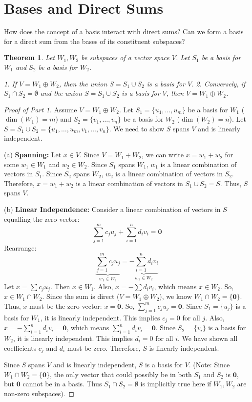 \documentclass[11pt]{article}
\theoremstyle{plain}
\newtheorem{theorem}{Theorem}[section]
\theoremstyle{definition}
\theoremstyle{remark}
\DeclareMathOperator{\dimv}{dim} %
\newcommand{\veczero}{\mathbf{0}} %
\begin{document}
\section{Bases and Direct Sums}

How does the concept of a basis interact with direct sums? Can we form a basis for a direct sum from the bases of its constituent subspaces?

\begin{theorem}
Let $W_1, W_2$ be subspaces of a vector space $V$. Let $S_1$ be a basis for $W_1$ and $S_2$ be a basis for $W_2$.

1.  If $V = W_1 \oplus W_2$, then the union $S = S_1 \cup S_2$ is a basis for $V$.
2.  Conversely, if $S_1 \cap S_2 = \emptyset$ and the union $S = S_1 \cup S_2$ is a basis for $V$, then $V = W_1 \oplus W_2$.
\end{theorem}

\begin{proof}[Proof of Part 1]
Assume $V = W_1 \oplus W_2$. Let $S_1 = \{u_1, \dots, u_m\}$ be a basis for $W_1$ ($\dimv(W_1)=m$) and $S_2 = \{v_1, \dots, v_n\}$ be a basis for $W_2$ ($\dimv(W_2)=n$). Let $S = S_1 \cup S_2 = \{u_1, \dots, u_m, v_1, \dots, v_n\}$. We need to show $S$ spans $V$ and is linearly independent.

(a) \textbf{Spanning:} Let $x \in V$. Since $V = W_1 + W_2$, we can write $x = w_1 + w_2$ for some $w_1 \in W_1$ and $w_2 \in W_2$.
Since $S_1$ spans $W_1$, $w_1$ is a linear combination of vectors in $S_1$.
Since $S_2$ spans $W_2$, $w_2$ is a linear combination of vectors in $S_2$.
Therefore, $x = w_1 + w_2$ is a linear combination of vectors in $S_1 \cup S_2 = S$.
Thus, $S$ spans $V$.

(b) \textbf{Linear Independence:} Consider a linear combination of vectors in $S$ equalling the zero vector:
\[ \sum_{j=1}^{m} c_j u_j + \sum_{i=1}^{n} d_i v_i = \veczero \]
Rearrange:
\[ \underbrace{\sum_{j=1}^{m} c_j u_j}_{w_1 \in W_1} = \underbrace{- \sum_{i=1}^{n} d_i v_i}_{w_2 \in W_2} \]
Let $x = \sum c_j u_j$. Then $x \in W_1$. Also, $x = -\sum d_i v_i$, which means $x \in W_2$.
So, $x \in W_1 \cap W_2$.
Since the sum is direct ($V = W_1 \oplus W_2$), we know $W_1 \cap W_2 = \{\veczero\}$.
Thus, $x$ must be the zero vector: $x = \veczero$.
So, $\sum_{j=1}^{m} c_j u_j = \veczero$. Since $S_1 = \{u_j\}$ is a basis for $W_1$, it is linearly independent. This implies $c_j = 0$ for all $j$.
Also, $x = -\sum_{i=1}^{n} d_i v_i = \veczero$, which means $\sum_{i=1}^{n} d_i v_i = \veczero$. Since $S_2 = \{v_i\}$ is a basis for $W_2$, it is linearly independent. This implies $d_i = 0$ for all $i$.
We have shown all coefficients $c_j$ and $d_i$ must be zero. Therefore, $S$ is linearly independent.

Since $S$ spans $V$ and is linearly independent, $S$ is a basis for $V$.
(Note: Since $W_1 \cap W_2 = \{\veczero\}$, the only vector that could possibly be in both $S_1$ and $S_2$ is $\veczero$, but $\veczero$ cannot be in a basis. Thus $S_1 \cap S_2 = \emptyset$ is implicitly true here if $W_1, W_2$ are non-zero subspaces).
\end{proof}
\end{document}
